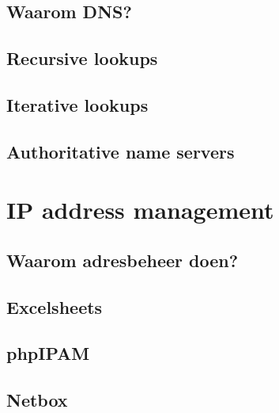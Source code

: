\subsection{Waarom DNS?}
\subsection{Recursive lookups}
\subsection{Iterative lookups}
\subsection{Authoritative name servers}


\section{IP address management}
\subsection{Waarom adresbeheer doen?}
\subsection{Excelsheets}
\subsection{phpIPAM}
\subsection{Netbox}


\begin{frame}
    
\end{frame}

